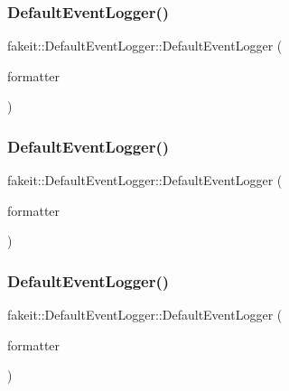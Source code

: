 \subsubsection{\texorpdfstring{DefaultEventLogger()}{DefaultEventLogger()}\hspace{0.1cm}{\footnotesize\ttfamily [6/9]}}
{\footnotesize\ttfamily fakeit\+::\+Default\+Event\+Logger\+::\+Default\+Event\+Logger (\begin{DoxyParamCaption}\item[{\mbox{\hyperlink{structfakeit_1_1EventFormatter}{Event\+Formatter}} \&}]{formatter }\end{DoxyParamCaption})\hspace{0.3cm}{\ttfamily [inline]}}

\mbox{\label{structfakeit_1_1DefaultEventLogger_a20fe9266e4a323b5fc282d797fe7ecfd}} 
\subsubsection{\texorpdfstring{DefaultEventLogger()}{DefaultEventLogger()}\hspace{0.1cm}{\footnotesize\ttfamily [7/9]}}
{\footnotesize\ttfamily fakeit\+::\+Default\+Event\+Logger\+::\+Default\+Event\+Logger (\begin{DoxyParamCaption}\item[{\mbox{\hyperlink{structfakeit_1_1EventFormatter}{Event\+Formatter}} \&}]{formatter }\end{DoxyParamCaption})\hspace{0.3cm}{\ttfamily [inline]}}

\mbox{\label{structfakeit_1_1DefaultEventLogger_a20fe9266e4a323b5fc282d797fe7ecfd}} 
\subsubsection{\texorpdfstring{DefaultEventLogger()}{DefaultEventLogger()}\hspace{0.1cm}{\footnotesize\ttfamily [8/9]}}
{\footnotesize\ttfamily fakeit\+::\+Default\+Event\+Logger\+::\+Default\+Event\+Logger (\begin{DoxyParamCaption}\item[{\mbox{\hyperlink{structfakeit_1_1EventFormatter}{Event\+Formatter}} \&}]{formatter }\end{DoxyParamCaption})\hspace{0.3cm}{\ttfamily [inline]}}


